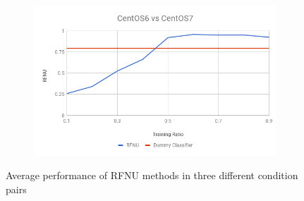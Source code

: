 \documentclass[10pt, conference, compsocconf]{IEEEtran}
\begin{document}
\begin{figure}[h!]
\begin{subfigure}[b]{0.8\linewidth}
                \includegraphics[width=\columnwidth]{figures/ALS/RFNU-ALS-6vs7-PFS}
        \end{subfigure}
        \caption{Average performance of RFNU methods in three different condition pairs}
        \label{fig:RFNU method}
\end{figure}
\end{document}
